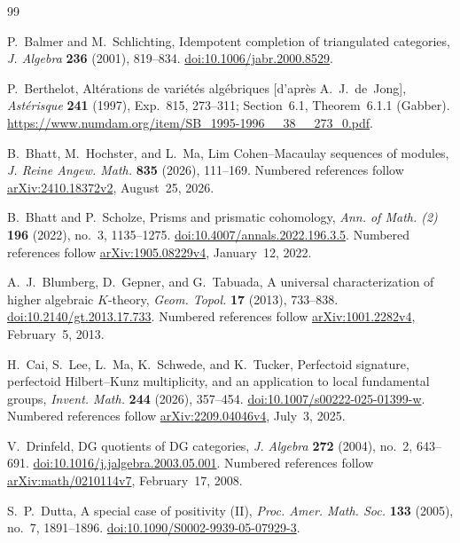 \begin{thebibliography}{99}
\raggedright

P.~Balmer and M.~Schlichting,
Idempotent completion of triangulated categories,
\emph{J. Algebra} \textbf{236} (2001), 819--834.
\href{https://doi.org/10.1006/jabr.2000.8529}{doi:10.1006/jabr.2000.8529}.

P.~Berthelot,
Alt\'erations de vari\'et\'es alg\'ebriques [d'apr\`es A.~J.~de~Jong],
\emph{Ast\'erisque} \textbf{241} (1997), Exp.~815, 273--311;
Section~6.1, Theorem~6.1.1 (Gabber).
\url{https://www.numdam.org/item/SB_1995-1996__38__273_0.pdf}.

B.~Bhatt, M.~Hochster, and L.~Ma,
Lim Cohen--Macaulay sequences of modules,
\emph{J. Reine Angew. Math.} \textbf{835} (2026), 111--169.
Numbered references follow
\href{https://arxiv.org/abs/2410.18372v2}{arXiv:2410.18372v2},
August~25, 2026.

B.~Bhatt and P.~Scholze,
Prisms and prismatic cohomology,
\emph{Ann. of Math. (2)} \textbf{196} (2022), no.~3, 1135--1275.
\href{https://doi.org/10.4007/annals.2022.196.3.5}{doi:10.4007/annals.2022.196.3.5}.
Numbered references follow
\href{https://arxiv.org/html/1905.08229v4}{arXiv:1905.08229v4},
January~12, 2022.

A.~J.~Blumberg, D.~Gepner, and G.~Tabuada,
A universal characterization of higher algebraic $K$-theory,
\emph{Geom. Topol.} \textbf{17} (2013), 733--838.
\href{https://doi.org/10.2140/gt.2013.17.733}{doi:10.2140/gt.2013.17.733}.
Numbered references follow
\href{https://arxiv.org/abs/1001.2282v4}{arXiv:1001.2282v4},
February~5, 2013.

H.~Cai, S.~Lee, L.~Ma, K.~Schwede, and K.~Tucker,
Perfectoid signature, perfectoid Hilbert--Kunz multiplicity, and an
application to local fundamental groups,
\emph{Invent. Math.} \textbf{244} (2026), 357--454.
\href{https://doi.org/10.1007/s00222-025-01399-w}{doi:10.1007/s00222-025-01399-w}.
Numbered references follow
\href{https://arxiv.org/html/2209.04046v4}{arXiv:2209.04046v4},
July~3, 2025.

V.~Drinfeld,
DG quotients of DG categories,
\emph{J. Algebra} \textbf{272} (2004), no.~2, 643--691.
\href{https://doi.org/10.1016/j.jalgebra.2003.05.001}{doi:10.1016/j.jalgebra.2003.05.001}.
Numbered references follow
\href{https://arxiv.org/abs/math/0210114v7}{arXiv:math/0210114v7},
February~17, 2008.

S.~P.~Dutta,
A special case of positivity (II),
\emph{Proc. Amer. Math. Soc.} \textbf{133} (2005), no.~7, 1891--1896.
\href{https://doi.org/10.1090/S0002-9939-05-07929-3}{doi:10.1090/S0002-9939-05-07929-3}.


\end{thebibliography}
